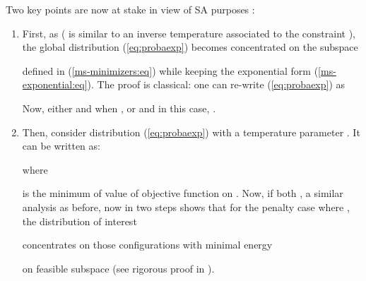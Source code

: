 \documentclass[draftcls,onecolumn]{IEEEtran}
\theoremstyle{plain}
\theoremstyle{definition}
\begin{document}
Two key points are now at stake in view of SA purposes 
\cite{geman-graffigne,robini-bresler-magnin}:
\begin{enumerate}
\item[]
First,
as 
( is similar to an inverse temperature associated to the constraint 
),
the global distribution 
(\ref{eq:probaexp}) becomes concentrated on the subspace 
 
defined in (\ref{ms-minimizers:eq})
while keeping the exponential form (\ref{ms-exponential:eq}).
The proof is classical:
one can re-write
(\ref{eq:probaexp}) as

Now, either  and  when , or  and in this case, .
\item[]
Then, consider distribution (\ref{eq:probaexp}) with a temperature parameter .
It can be written as:


where 
 
is the minimum of value of objective function  on .
Now, if both 
,
a similar analysis as before,
now in two steps 
shows that for the penalty case
where  ,
the distribution of interest

concentrates on those configurations with minimal energy

on feasible subspace  
(see rigorous proof in 
\cite{geman-graffigne, robini-bresler-magnin}).
\end{enumerate}
 
\end{document}
